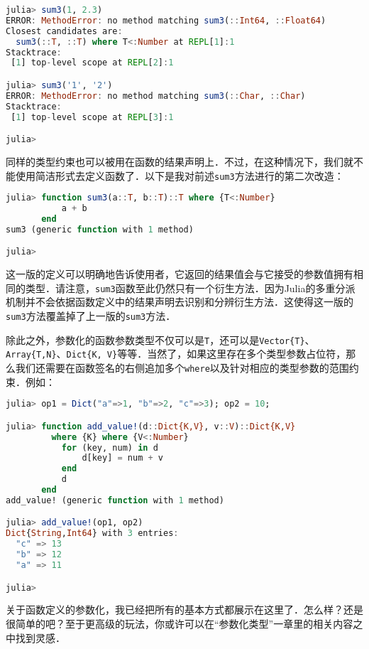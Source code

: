 \begin{lstlisting}[language=julia]
julia> sum3(1, 2.3)
ERROR: MethodError: no method matching sum3(::Int64, ::Float64)
Closest candidates are:
  sum3(::T, ::T) where T<:Number at REPL[1]:1
Stacktrace:
 [1] top-level scope at REPL[2]:1

julia> sum3('1', '2')
ERROR: MethodError: no method matching sum3(::Char, ::Char)
Stacktrace:
 [1] top-level scope at REPL[3]:1

julia> 
\end{lstlisting}

同样的类型约束也可以被用在函数的结果声明上．不过，在这种情况下，我们就不能使用简洁形式去定义函数了．以下是我对前述\verb|sum3|方法进行的第二次改造：

\begin{lstlisting}[language=julia]
julia> function sum3(a::T, b::T)::T where {T<:Number}
           a + b
       end
sum3 (generic function with 1 method)

julia> 
\end{lstlisting}

这一版的定义可以明确地告诉使用者，它返回的结果值会与它接受的参数值拥有相同的类型．请注意，\verb|sum3|函数至此仍然只有一个衍生方法．因为Julia的多重分派机制并不会依据函数定义中的结果声明去识别和分辨衍生方法．这使得这一版的\verb|sum3|方法覆盖掉了上一版的\verb|sum3|方法．

除此之外，参数化的函数参数类型不仅可以是\verb|T|，还可以是\verb|Vector{T}|、\verb|Array{T,N}|、\verb|Dict{K, V}|等等．当然了，如果这里存在多个类型参数占位符，那么我们还需要在函数签名的右侧追加多个\verb|where|以及针对相应的类型参数的范围约束．例如：

\begin{lstlisting}[language=julia]
julia> op1 = Dict("a"=>1, "b"=>2, "c"=>3); op2 = 10;

julia> function add_value!(d::Dict{K,V}, v::V)::Dict{K,V} 
         where {K} where {V<:Number}
           for (key, num) in d
               d[key] = num + v
           end
           d
       end
add_value! (generic function with 1 method)

julia> add_value!(op1, op2)
Dict{String,Int64} with 3 entries:
  "c" => 13
  "b" => 12
  "a" => 11

julia> 
\end{lstlisting}

关于函数定义的参数化，我已经把所有的基本方式都展示在这里了．怎么样？还是很简单的吧？至于更高级的玩法，你或许可以在“参数化类型”一章里的相关内容之中找到灵感．